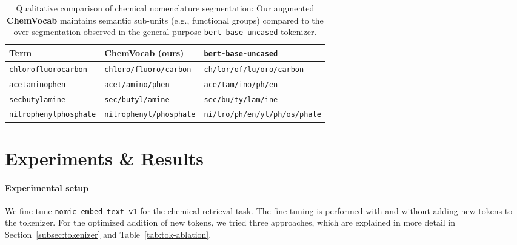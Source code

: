 \documentclass[twoside,twocolumn,9pt]{article}
\begin{document}
\begin{table}[t]
\centering
\small
\setlength{\tabcolsep}{6pt}
\renewcommand{\arraystretch}{1.15}
\begin{tabular}{@{}l l l@{}}
\toprule
\textbf{Term} & \textbf{ChemVocab (ours)} & \textbf{\texttt{bert-base-uncased}} \\
\midrule
\texttt{chlorofluorocarbon}     & \texttt{chloro/fluoro/carbon}            & \texttt{ch/lor/of/lu/oro/carbon} \\
\texttt{acetaminophen}          & \texttt{acet/amino/phen}                 & \texttt{ace/tam/ino/ph/en} \\
\texttt{secbutylamine}          & \texttt{sec/butyl/amine}                  & \texttt{sec/bu/ty/lam/ine} \\
\texttt{nitrophenylphosphate}   & \texttt{nitrophenyl/phosphate}           & \texttt{ni/tro/ph/en/yl/ph/os/phate} \\
\bottomrule
\end{tabular}
\caption{Qualitative comparison of chemical nomenclature segmentation: Our augmented \textbf{ChemVocab} maintains semantic sub-units (e.g., functional groups) compared to the over-segmentation observed in the general-purpose \texttt{bert-base-uncased} tokenizer.}
\label{tab:chemvocab-examples}
\end{table}

\section{Experiments \& Results}
\label{sec:exp-results}
\paragraph*{Experimental setup} We fine-tune \texttt{nomic-embed-text-v1} for the chemical retrieval task. The fine-tuning is performed with and without adding new tokens to the tokenizer. For the optimized addition of new tokens, we tried three approaches, which are explained in more detail in Section~\ref {subsec:tokenizer} and Table~\ref{tab:tok-ablation}.
\end{document}
